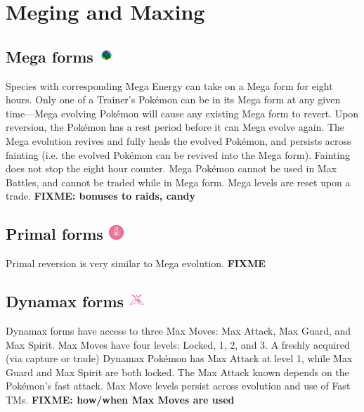 \chapter{Meging and Maxing}
\label{chap:megmax}

\section{Mega forms \includegraphics[width=1em,height=1em]{images/mega.png}}
\label{section:mega}
Species with corresponding Mega Energy can take on a Mega form for eight hours.
Only one of a Trainer's Pokémon can be in its Mega form at any given time---Mega
  evolving Pokémon will cause any existing Mega form to revert.
Upon reversion, the Pokémon has a rest period before it can Mega evolve again.
The Mega evolution revives and fully heals the evolved Pokémon, and persists across
  fainting (i.e. the evolved Pokémon can be revived into the Mega form).
Fainting does not stop the eight hour counter.
Mega Pokémon cannot be used in Max Battles, and cannot be traded while in Mega form.
Mega levels are reset upon a trade.
\textbf{FIXME: bonuses to raids, candy}


\section{Primal forms \includegraphics[width=1em,height=1em]{images/primal.png}}
\label{section:primal}
Primal reversion is very similar to Mega evolution.
\textbf{FIXME}

\section{Dynamax forms \includegraphics[width=1em,height=1em]{images/dynamax.png}}
\label{section:dmax}
Dynamax forms have access to three Max Moves: Max Attack, Max Guard, and Max Spirit.
Max Moves have four levels: Locked, 1, 2, and 3.
A freshly acquired (via capture or trade) Dynamax Pokémon has Max Attack at level 1,
  while Max Guard and Max Spirit are both locked.
The Max Attack known depends on the Pokémon's fast attack.
Max Move levels persist across evolution and use of Fast TMs.
\textbf{FIXME: how/when Max Moves are used}


